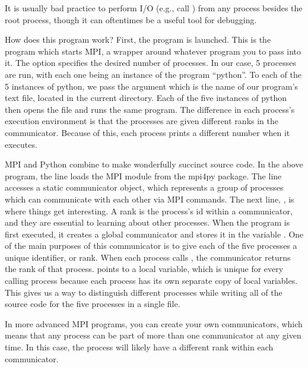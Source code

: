 \begin{warn}
It is usually bad practice to perform I/O (e.g., call ) from any process 
besides the root process, though it can oftentimes be a useful tool for debugging.
\end{warn}

How does this program work?
First, the  program is launched. 
This is the program which starts MPI, a wrapper around whatever program you to pass into it. 
The  option specifies the desired number of processes. 
In our case, 5 processes are run, with each one being an instance of the program ``python''. 
To each of the 5 instances of python, we pass the argument  which is the name of our program's text file, 
located in the current directory. Each of the five instances of python then opens the 
 file and runs the same program. 
The difference in each process's execution environment is that the processes are given 
different ranks in the communicator. Because of this, each process prints a different 
number when it executes.

MPI and Python combine to make wonderfully succinct source code. 
In the above program, the line  loads the MPI module from the mpi4py package.
The line  accesses a static communicator object, which represents a group of processes which can communicate with each other via MPI commands.
The next line, , is where things get interesting. 
A rank is the process's id within a communicator, and they are essential to learning 
about other processes. When the program  is first executed, it creates a 
global communicator and stores it in the variable . 
One of the main purposes of this communicator is to give each of the five processes a 
unique identifier, or rank. When each process calls , 
the communicator returns the rank of that process. 
 points to a local variable, which is unique for every calling process 
because each process has its own separate copy of local variables. 
This gives us a way to distinguish different processes while writing all of the source code 
for the five processes in a single file.

In more advanced MPI programs, you can create your own communicators, which means that 
any process can be part of more than one communicator at any given time. 
In this case, the process will likely have a different rank within each communicator.



